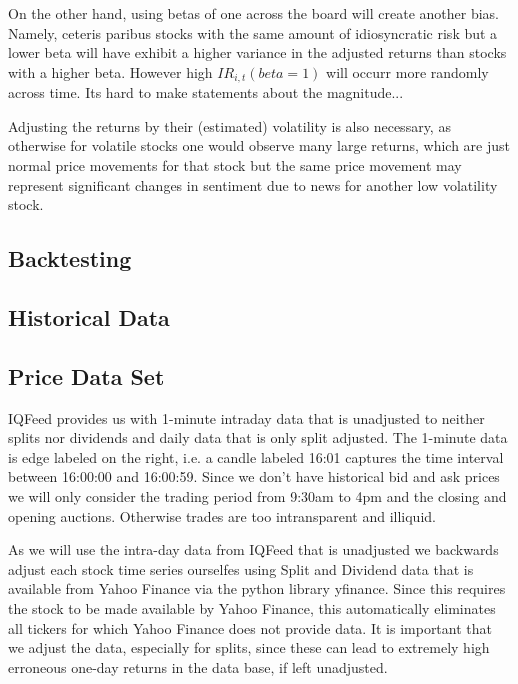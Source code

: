 \documentclass[12pt,a4paper]{article}
\begin{document}
	On the other hand, using betas of one across the board will create another bias.
	Namely, ceteris paribus stocks with the same amount of idiosyncratic risk but a lower beta will have exhibit a higher variance in the adjusted returns than stocks with a higher beta.
	However high $IR_{i,t}(beta=1)$ will occurr more randomly across time.
	Its hard to make statements about the magnitude...
	
	Adjusting the returns by their (estimated) volatility is also necessary, as otherwise for volatile stocks
	one would observe many large returns, which are just normal price movements for that stock but the same price movement may represent significant changes in sentiment due to news for another low volatility stock.
	
	
	
	\subsection{Backtesting}
	
	\subsection{Historical Data}
	
	\subsection{Price Data Set}
	IQFeed provides us with 1-minute intraday data that is unadjusted to neither splits nor dividends and daily data that is only split adjusted. 
	The 1-minute data is edge labeled on the right, i.e. a candle labeled 16:01 captures the time interval between 16:00:00 and 16:00:59.
	Since we don't have historical bid and ask prices we will only consider the trading period from 9:30am to 4pm and the closing and opening auctions.
	Otherwise trades are too intransparent and illiquid.
	
	As we will use the intra-day data from IQFeed that is unadjusted we backwards adjust each stock time series ourselfes using Split and Dividend data that is available from Yahoo Finance via the python library yfinance.
	Since this requires the stock to be made available by Yahoo Finance, this automatically eliminates all tickers for which Yahoo Finance does not provide data.
	It is important that we adjust the data, especially for splits, since these can lead to extremely high erroneous one-day returns in the data base, if left unadjusted.
	
\end{document}
